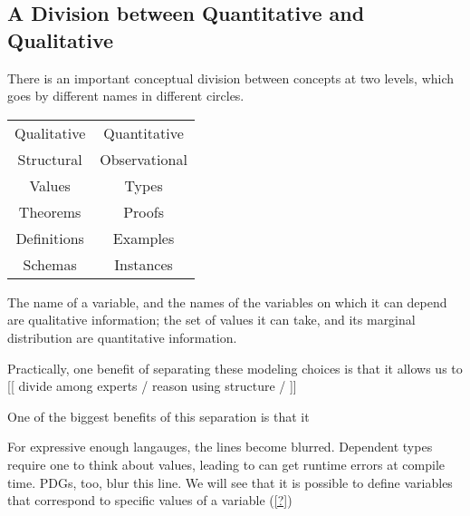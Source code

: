 
\subsection{A Division between Quantitative and Qualitative}

There is an important conceptual division between concepts at two levels,
which goes by different names in different circles. 

\begin{center}
\begin{tabular}{c|c}
    Qualitative & Quantitative \\ 
    Structural & Observational \\
    Values & Types \\ 
    Theorems & Proofs \\
    Definitions & Examples \\
    Schemas & Instances 
\end{tabular}
\end{center}

The name of a variable, and the names of the variables on which it can depend are qualitative information; the set of values it can take, and its marginal distribution are quantitative information. 

Practically, one benefit of separating these modeling choices is that it allows us to  [[ divide among experts / reason using structure /  ]]

One of the biggest benefits of this separation is that it 

For expressive enough langauges, the lines become blurred. 
Dependent types require one to think about values, leading to can get runtime errors at compile time. 
PDGs, too, blur this line.  We will see that it is possible to define variables that correspond to specific values of a variable (\cref{?})

%


